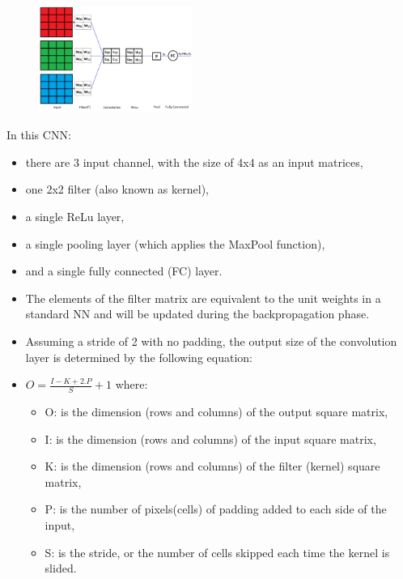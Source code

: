 \begin{vbframe}

 \begin{figure}
    \centering
    \includegraphics[width=5cm]{figure/3channel.png}
  \end{figure}

In this CNN:
    \begin{itemize}
       \item there are 3 input channel, with the size of 4x4 as an input matrices, 
       \item one 2x2 filter (also known as kernel), 
       \item a single ReLu layer,
       \item a single pooling layer (which applies the MaxPool function),
       \item and a single fully connected (FC) layer.
    \end{itemize}

    \begin{itemize}
       \item The elements of the filter matrix are equivalent to the unit weights in a standard NN and will be updated during the backpropagation phase.
       \item Assuming a stride of 2 with no padding, the output size of the convolution layer is determined by the following equation:
       \item $ O = \frac{I - K + 2.P}{S} + 1$ where: 
    \begin{itemize}
       \item O: is the dimension (rows and columns) of the output square matrix, 
       \item I: is the dimension (rows and columns) of the input square matrix,
       \item K: is the dimension (rows and columns) of the filter (kernel) square matrix, 
       \item P: is the number of pixels(cells) of padding added to each side of the input,
       \item S: is the stride, or the number of cells skipped each time the kernel is slided.
    \end{itemize}
    \end{itemize}


\end{vbframe}
